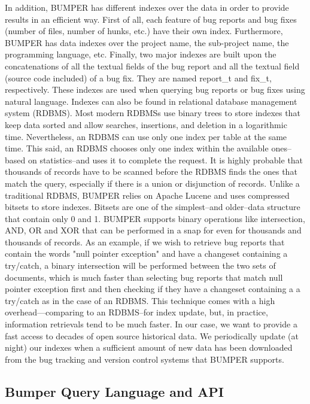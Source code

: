 \documentclass[conference]{IEEEtran}
\begin{document}
In addition, BUMPER has different indexes over the data in order to provide results in an efficient way.
First of all, each feature of bug reports and bug fixes (number of files, number of hunks, etc.) have their own index.
Furthermore, BUMPER has data indexes over the project name, the sub-project name, the programming language, etc.
Finally, two major indexes are built upon the concatenations of all the textual fields of the bug report and all the textual field (source code included) of a bug fix.
They are named report\_t and fix\_t, respectively.
These indexes are used when querying bug reports or bug fixes using natural language.
Indexes can also be found in relational database management system (RDBMS).
Most modern RDBMSs use binary trees to store indexes that keep data sorted and allow searches, insertions, and deletion in a logarithmic time.
Nevertheless, an RDBMS can use only one index per table at the same time.
This said, an RDBMS chooses only one index within the available ones--based on statistics--and uses it to complete the request.
It is highly probable that thousands of records have to be scanned before the RDBMS finds the ones that match the query, especially if there is a union or disjunction of records.
Unlike a traditional RDBMS, BUMPER relies on Apache Lucene and uses compressed bitsets to store indexes.
Bitsets are one of the simplest--and older--data structure that contain only 0 and 1.
BUMPER supports binary operations like intersection, AND, OR and XOR that can be performed in a snap for even for thousands and thousands of records.
As an example, if we wish to retrieve bug reports that contain the words "null pointer exception" and have a changeset containing a try/catch, a binary intersection will be performed between the two sets of documents, which is much faster than selecting bug reports that match null pointer exception first and then checking if they have a changeset containing a a try/catch as in the case of an RDBMS.
This technique comes with a high overhead—comparing to an RDBMS--for index update, but, in practice, information retrievals tend to be much faster.
In our case, we want to provide a fast access to decades of open source historical data.
We periodically update (at night) our indexes when a sufficient amount of new data has been downloaded from the bug tracking and version control systems that BUMPER supports.

\subsection{Bumper Query Language and API}
\label{sub:Bumper Query Language and API}
\end{document}
